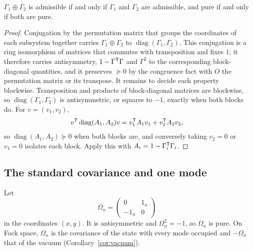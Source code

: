 \begin{theorem}\label{thm:sum}
$\Gamma_1\oplus\Gamma_2$ is admissible if and only if $\Gamma_1$ and $\Gamma_2$ are
admissible, and pure if and only if both are pure.
\end{theorem}
\begin{proof}
Conjugation by the permutation matrix that groups the coordinates of each subsystem
together carries $\Gamma_1\oplus\Gamma_2$ to $\operatorname{diag}(\Gamma_1,\Gamma_2)$.
This conjugation is a ring isomorphism of matrices that commutes with
transposition and fixes $1$; it therefore carries antisymmetry,
$1-\Gamma^{\mathsf T}\Gamma$ and $\Gamma^2$ to the corresponding block-diagonal
quantities, and it preserves $\succeq0$ by the congruence fact with $O$ the
permutation matrix or its transpose. It remains to decide each property blockwise.
Transposition and products of block-diagonal matrices are blockwise, so
$\operatorname{diag}(\Gamma_1,\Gamma_2)$ is antisymmetric, or squares to $-1$,
exactly when both blocks do. For $v=(v_1,v_2)$,
\[
 v^{\mathsf T}\operatorname{diag}(A_1,A_2)v=v_1^{\mathsf T}A_1v_1+v_2^{\mathsf T}A_2v_2,
\]
so $\operatorname{diag}(A_1,A_2)\succeq0$ when both blocks are, and conversely
taking $v_2=0$ or $v_1=0$ isolates each block. Apply this with
$A_i=1-\Gamma_i^{\mathsf T}\Gamma_i$.
\end{proof}

\subsection{The standard covariance and one mode}
Let
\begin{equation}\label{eq:standard}
 \Omega_n=\begin{pmatrix}0&1_n\\-1_n&0\end{pmatrix}
\end{equation}
in the coordinates $(x,y)$. It is antisymmetric and $\Omega_n^2=-1$, so $\Omega_n$
is pure. On Fock
space, $\Omega_n$ is the covariance of the state with every mode occupied and $-\Omega_n$
that of the vacuum (Corollary~\ref{cor:vacuum}).

